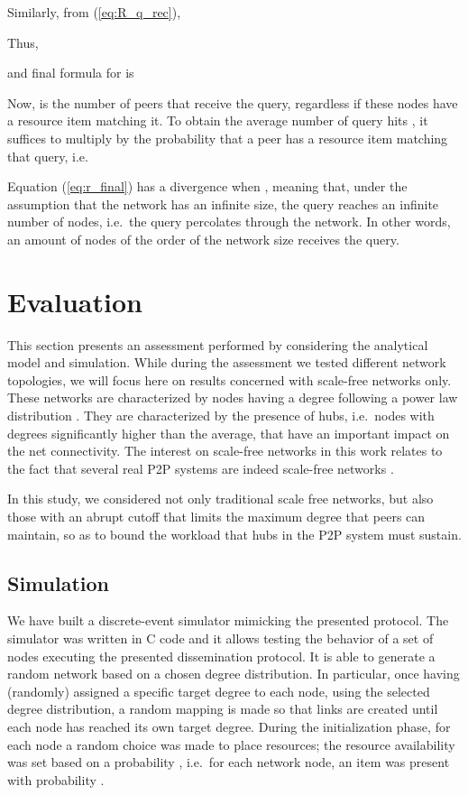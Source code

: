 \documentclass{sig-alternate}
\begin{document}
Similarly, from (\ref{eq:R_q_rec}),

Thus,

and final formula for  is



Now,  is the number of peers that receive the query, regardless if these nodes have a resource item matching it. To obtain the average number of query hits , it suffices to multiply  by the probability  that a peer has a resource item matching that query, i.e.~


Equation (\ref{eq:r_final}) has a divergence when , meaning that, under the assumption that the network has an infinite size, the query reaches an infinite number of nodes, i.e.~the query percolates through the network.
In other words, an amount of nodes of the order of the network size receives the query.

\section{Evaluation}\label{sec:exp}

This section presents an assessment performed by considering the analytical model and simulation. While during the assessment we tested different network topologies, we will focus here on results concerned with scale-free networks only.
These networks are characterized by nodes having a degree following a power law distribution . 
They are characterized by the presence of hubs, i.e.~nodes with degrees significantly higher than the average, that have an important impact on the net connectivity.
The interest on scale-free networks in this work relates to the fact that several real \ac{P2P} systems are indeed scale-free networks \cite{simutools,newmanHandbook}.

In this study, we considered not only traditional scale free networks, but also those with an abrupt cutoff  that limits the maximum degree that peers can maintain, so as to bound the workload that hubs in the P2P system must sustain. 

\subsection{Simulation}

We have built a discrete-event simulator mimicking the presented protocol. The simulator was written in C code and it allows testing the behavior of a set of nodes executing the presented dissemination protocol.
It is able to generate a random network based on a chosen degree distribution. In particular, once having (randomly) assigned a specific target degree to each node, using the selected degree distribution, a random mapping is made so that links are created until each node has reached its own target degree.
During the initialization phase, for each node a random choice was made to place resources; the resource availability was set based on a probability , i.e.~for each network node, an item was present with probability .
\end{document}
